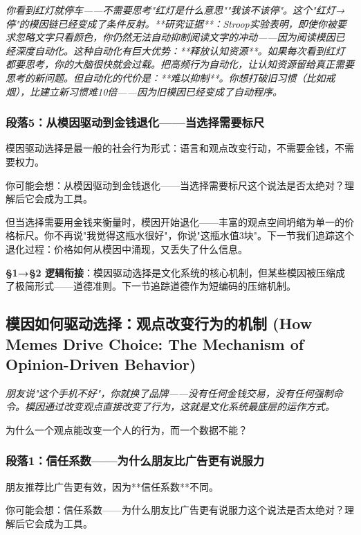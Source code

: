 \documentclass[a4paper,12pt]{book}
\newenvironment{motivation}{\begin{tcolorbox}[colback=gray!10,colframe=gray!60,title=\textit{本章动机 (Motivation)},fonttitle=\bfseries,arc=0mm,leftrule=3mm]\small\itshape}{\end{tcolorbox}}
\newenvironment{questionbox}{\begin{tcolorbox}[colback=red!3!white,colframe=red!60!black]}{\end{tcolorbox}}
\begin{document}
\begin{motivation}
\begin{motivation}
\begin{motivation}
你看到红灯就停车——不需要思考"红灯是什么意思""我该不该停"。这个"红灯→停"的模因链已经变成了条件反射。**研究证据**：Stroop实验表明，即使你被要求忽略文字只看颜色，你仍然无法自动抑制阅读文字的冲动——因为阅读模因已经深度自动化。这种自动化有巨大优势：**释放认知资源**。如果每次看到红灯都要思考，你的大脑很快就会过载。把高频行为自动化，让认知资源留给真正需要思考的新问题。但自动化的代价是：**难以抑制**。你想打破旧习惯（比如戒烟），比建立新习惯难10倍——因为旧模因已经变成了自动程序。

	\subsubsection*{段落5：从模因驱动到金钱退化——当选择需要标尺}
	模因驱动选择是最一般的社会行为形式：语言和观点改变行动，不需要金钱，不需要权力。
	\begin{tcolorbox}[colback=yellow!5, title=\textit{读者行为预测}]
		你可能会想：从模因驱动到金钱退化——当选择需要标尺这个说法是否太绝对？理解后它会成为工具。
	\end{tcolorbox}

但当选择需要用金钱来衡量时，模因开始退化——丰富的观点空间坍缩为单一的价格标尺。你不再说"我觉得这瓶水很好"，你说"这瓶水值3块"。下一节我们追踪这个退化过程：价格如何从模因中涌现，又丢失了什么信息。

	\textbf{§1→§2 逻辑衔接}：模因驱动选择是文化系统的核心机制，但某些模因被压缩成了极简形式——道德准则。下一节追踪道德作为短编码的压缩机制。

\subsection{模因如何驱动选择：观点改变行为的机制 (How Memes Drive Choice: The Mechanism of Opinion-Driven Behavior)}
\begin{motivation}
	朋友说"这个手机不好"，你就换了品牌——没有任何金钱交易，没有任何强制命令。模因通过改变观点直接改变了行为，这就是文化系统最底层的运作方式。
\end{motivation}
\begin{questionbox}
	为什么一个观点能改变一个人的行为，而一个数据不能？
\end{questionbox}

	\subsubsection*{段落1：信任系数——为什么朋友比广告更有说服力}
朋友推荐比广告更有效，因为**信任系数**不同。
	\begin{tcolorbox}[colback=yellow!5, title=\textit{读者行为预测}]
		你可能会想：信任系数——为什么朋友比广告更有说服力这个说法是否太绝对？理解后它会成为工具。
	\end{tcolorbox}


\end{motivation}
\end{motivation}
\end{motivation}
\end{document}
